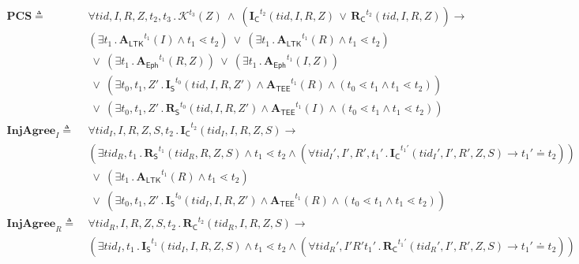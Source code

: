 \documentclass[runningheads]{llncs}
\newcommand{\mFunStyle}[1]{\textsf{#1}}
\newcommand{\mRevLTK}{\ensuremath{\mathbf{A}_\mFunStyle{LTK}}}
\newcommand{\mTEE}{\ensuremath{\mathbf{A}_\mFunStyle{TEE}}}
\newcommand{\mRevEph}{\ensuremath{\mathbf{A}_\mFunStyle{Eph}}}
\newcommand{\mIStart}{\ensuremath{\mathbf{I}_\mFunStyle{S}}}
\newcommand{\mIComplete}{\ensuremath{\mathbf{I}_\mFunStyle{C}}}
\newcommand{\mRStart}{\ensuremath{\mathbf{R}_\mFunStyle{S}}}
\newcommand{\mRComplete}{\ensuremath{\mathbf{R}_\mFunStyle{C}}}
\newcommand{\mPredPcs}{\ensuremath{\mathbf{PCS}}}
\newcommand{\mPredInjI}{\ensuremath{\mathbf{InjAgree}_I}}
\newcommand{\mPredInjR}{\ensuremath{\mathbf{InjAgree}_R}}
\newcommand{\mK}{\ensuremath{\mathcal{K}}}
\DeclareMathOperator{\mLogicDot}{.}
\newcommand{\mSessKey}{\ensuremath{Z}}
\newcommand{\mTID}{\ensuremath{\mathit{tid}}}
\begin{document}
\begin{figure*}[htp]
\begin{align*}
    \mPredPcs \triangleq\ & \forall \mTID, I, R, \mSessKey, t_2, t_3\mLogicDot
    \mK^{t_3}(\mSessKey)\  \land\ 
    (\mIComplete^{t_2}(\mTID, I, R, \mSessKey)\, \lor\, 
\mRComplete^{t_2}(\mTID, 
I, R, 
\mSessKey))
    \rightarrow\\
    &(\exists t_1\mLogicDot \mRevLTK^{t_1}(I) \land t_1 \lessdot t_2)
    \ \lor\ (\exists t_1\mLogicDot \mRevLTK^{t_1}(R) \land t_1 \lessdot t_2)\\
    &\ \lor\ (\exists t_1\mLogicDot \mRevEph^{t_1}(R, \mSessKey))
    \ \lor\ (\exists t_1\mLogicDot \mRevEph^{t_1}(I, \mSessKey))\\
	&\ \lor\ (\exists t_0, t_1, Z'\mLogicDot \mIStart^{t_0}(\mTID, I, R, Z') \land 
\mTEE^{t_1}(R) \land (t_0 \lessdot t_1 \land t_1 \lessdot t_2))\\
    &\ \lor\ (\exists t_0, t_1, Z'\mLogicDot \mRStart^{t_0}(\mTID, I, R, Z') 
\land \mTEE^{t_1}(I) \land (t_0 \lessdot t_1 \land t_1 \lessdot t_2))\\[1em]
%
    \mPredInjI \triangleq\ &
    \forall \mTID_I, I, R, \mSessKey, S, t_2\mLogicDot \mIComplete^{t_2}(\mTID_{I}, I, R, 
\mSessKey, S)
    \rightarrow\\
    &(\exists \mTID_R, t_1\mLogicDot \mRStart^{t_1}(\mTID_R, R, \mSessKey, 
S) \land t_1 \lessdot t_2
    \land (\forall \mTID_I', I', R', t_1' \mLogicDot \mIComplete^{t_1'}(\mTID_I', 
I' , R', \mSessKey, S)
        \rightarrow t_1' \doteq t_2))\\
    &\ \lor\ (\exists t_1\mLogicDot \mRevLTK^{t_1}(R) \land t_1 \lessdot t_2)\\
    &\ \lor\ (\exists t_0, t_1, Z'\mLogicDot \mIStart^{t_0}(\mTID_I, I, R, Z') \land 
\mTEE^{t_1}(R) \land (t_0 \lessdot t_1 \land t_1 \lessdot t_2))\\[1em]
%
    \mPredInjR \triangleq\ &
    \forall \mTID_R, I, R, \mSessKey, S, t_2\mLogicDot 
\mRComplete^{t_2}(\mTID_R, 
I, R, 
\mSessKey, S)
    \rightarrow\\
    &(\exists \mTID_I, t_1\mLogicDot \mIStart^{t_1}(\mTID_I, I, R, \mSessKey, 
S) \land t_1 \lessdot t_2
    \land (\forall \mTID_R', I' R' t_1' \mLogicDot 
\mRComplete^{t_1'}(\mTID_R', 
I' , R', \mSessKey, S)
        \rightarrow t_1' \doteq t_2))\\

\end{align*}
\end{figure*}
\end{document}
